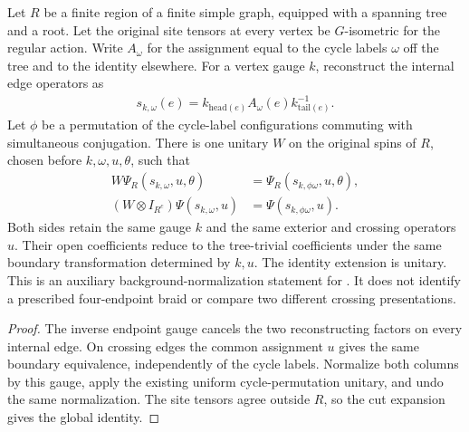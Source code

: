 \begin{lemma}
    \label{thm:peps_regular_gauged_cycle_permutation}
    \leanok
    Let $R$ be a finite region of a finite simple graph, equipped with a
    spanning tree and a root. Let the original site tensors at every
    vertex be $G$-isometric for the regular action. Write $A_\omega$ for the
    assignment equal to the cycle labels $\omega$ off the tree and to
    the identity elsewhere. For a vertex gauge $k$, reconstruct the
    internal edge operators as
    \begin{align}
        s_{k,\omega}(e)
        =k_{\mathrm{head}(e)}A_\omega(e)k_{\mathrm{tail}(e)}^{-1}.
    \end{align}
    Let $\phi$ be a permutation of the cycle-label configurations
    commuting with simultaneous conjugation. There is one unitary $W$
    on the original spins of $R$, chosen before $k,\omega,u,\theta$,
    such that
    \begin{align}
        W\Psi_R(s_{k,\omega},u,\theta)
         & =\Psi_R(s_{k,\phi\omega},u,\theta), \\
        (W\otimes I_{R^c})\Psi(s_{k,\omega},u)
         & =\Psi(s_{k,\phi\omega},u).
    \end{align}
    Both sides retain the same gauge $k$ and the same exterior
    and crossing operators $u$. Their open coefficients reduce
    to the tree-trivial coefficients under the same boundary transformation
    determined by $k,u$. The identity extension is unitary.
    This is an auxiliary background-normalization statement for
    \cite[accessible systems and Theorem~6.16]{Schuch2010PEPS}. It does
    not identify a prescribed four-endpoint braid or compare two
    different crossing presentations.
\end{lemma}

\begin{proof}\leanok
    The inverse endpoint gauge cancels the two reconstructing factors
    on every internal edge. On crossing edges the common assignment
    $u$ gives the same boundary equivalence, independently of the cycle
    labels. Normalize both columns by this gauge, apply the
    existing uniform cycle-permutation unitary, and undo the same
    normalization. The site tensors agree outside $R$, so the
    cut expansion gives the global identity.
\end{proof}

